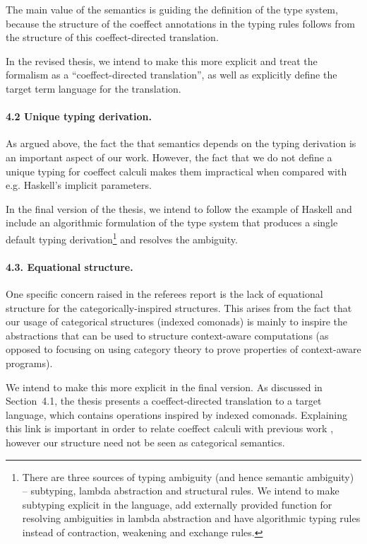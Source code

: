 \documentclass[
		twoside,openright,titlepage,numbers=noenddot,headinclude,%
                footinclude=true,cleardoublepage=empty,
                BCOR=10mm,paper=a4,fontsize=10pt, %
                ngerman,american, %
                ]{scrreprt}
\begin{document}
The main value of the semantics is guiding the definition of the type system, because the structure
of the coeffect annotations in the typing rules follows from the structure of this coeffect-directed
translation.

In the revised thesis, we intend to make this more explicit and treat the formalism as a
``coeffect-directed translation'', as well as explicitly define the target term language
for the translation.

\paragraph{4.2 Unique typing derivation.}

As argued above, the fact the that semantics depends on the typing derivation is an important
aspect of our work. However, the fact that we do not define a unique typing for coeffect
calculi makes them impractical when compared with e.g. Haskell's implicit parameters.

In the final version of the thesis, we intend to follow the example of Haskell and include an
algorithmic formulation of the type system that produces a single default typing
derivation\footnote{There are three sources of typing ambiguity (and hence semantic ambiguity) --
subtyping, lambda abstraction and structural rules. We intend to make subtyping explicit in the
language, add externally provided function for resolving ambiguities in lambda abstraction and
have algorithmic typing rules instead of contraction, weakening and exchange rules.} and
resolves the ambiguity.

\paragraph{4.3. Equational structure.}

One specific concern raised in the referees report is the lack of equational structure for the
categorically-inspired structures. This arises from the fact that our usage of categorical
structures (indexed comonads) is mainly to inspire the abstractions that can be used to structure
context-aware computations (as opposed to focusing on using category theory to prove properties
of context-aware programs).

We intend to make this more explicit in the final version. As discussed in Section~4.1, the thesis
presents a coeffect-directed translation to a target language, which contains operations inspired
by indexed comonads. Explaining this link is important in order to relate coeffect calculi with
previous work \cite{comonads-notions}, however our structure need not be seen as categorical
semantics.
\end{document}
